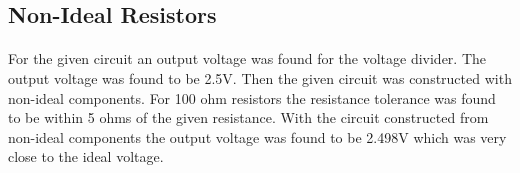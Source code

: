 \documentclass{article}
\begin{document}
\subsection*{Non-Ideal Resistors}
\paragraph{}
For the given circuit an output voltage was found for the voltage divider. The output voltage was found to be 2.5V. Then the given circuit was constructed with 
non-ideal components. For 100 ohm resistors the resistance tolerance was found to be within 5 ohms of the given resistance. With the circuit constructed from
non-ideal components the output voltage was found to be 2.498V which was very close to the ideal voltage. 
\end{document}

